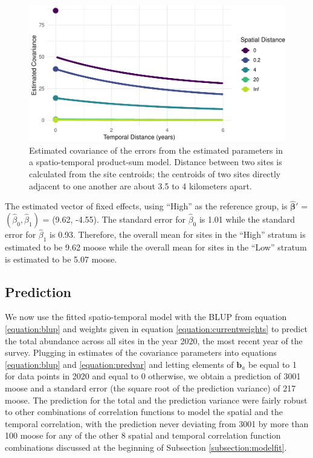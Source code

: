 \documentclass[]{article}    %
\begin{document}
\begin{figure}
\centering
\includegraphics{covplot-1.pdf}
\caption{\label{fig:covplot} Estimated covariance of the errors from the
estimated parameters in a spatio-temporal product-sum model. Distance
between two sites is calculated from the site centroids; the centroids
of two sites directly adjacent to one another are about 3.5 to 4
kilometers apart.}
\end{figure}

The estimated vector of fixed effects, using ``High'' as the reference
group, is \(\bm{\hat{\beta}}'\) = \((\hat{\beta}_0, \hat{\beta}_1)\) =
(9.62, -4.55). The standard error for \(\hat{\beta}_0\) is 1.01 while
the standard error for \(\hat{\beta}_1\) is 0.93. Therefore, the overall
mean for sites in the ``High'' stratum is estimated to be 9.62 moose
while the overall mean for sites in the ``Low'' stratum is estimated to
be 5.07 moose.

\hypertarget{prediction}{%
\subsection{Prediction}\label{prediction}}

We now use the fitted spatio-temporal model with the BLUP from equation
\ref{equation:blup} and weights given in equation
\ref{equation:currentweights} to predict the total abundance across all
sites in the year 2020, the most recent year of the survey. Plugging in
estimates of the covariance parameters into equations
\ref{equation:blup} and \ref{equation:predvar} and letting elements of
\(\mathbf{b}_a\) be equal to 1 for data points in 2020 and equal to 0
otherwise, we obtain a prediction of 3001 moose and a standard error
(the square root of the prediction variance) of 217 moose. The
prediction for the total and the prediction variance were fairly robust
to other combinations of correlation functions to model the spatial and
the temporal correlation, with the prediction never deviating from 3001
by more than 100 moose for any of the other 8 spatial and temporal
correlation function combinations discussed at the beginning of
Subsection \ref{subsection:modelfit}.
\end{document}
